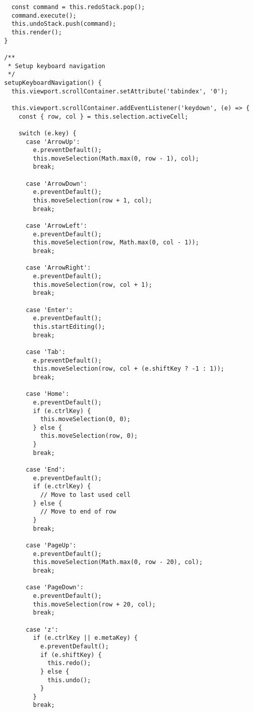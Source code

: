 \documentclass[11pt]{article}
\begin{document}
\begin{verbatim}
    const command = this.redoStack.pop();
    command.execute();
    this.undoStack.push(command);
    this.render();
  }
  
  /**
   * Setup keyboard navigation
   */
  setupKeyboardNavigation() {
    this.viewport.scrollContainer.setAttribute('tabindex', '0');
    
    this.viewport.scrollContainer.addEventListener('keydown', (e) => {
      const { row, col } = this.selection.activeCell;
      
      switch (e.key) {
        case 'ArrowUp':
          e.preventDefault();
          this.moveSelection(Math.max(0, row - 1), col);
          break;
          
        case 'ArrowDown':
          e.preventDefault();
          this.moveSelection(row + 1, col);
          break;
          
        case 'ArrowLeft':
          e.preventDefault();
          this.moveSelection(row, Math.max(0, col - 1));
          break;
          
        case 'ArrowRight':
          e.preventDefault();
          this.moveSelection(row, col + 1);
          break;
          
        case 'Enter':
          e.preventDefault();
          this.startEditing();
          break;
          
        case 'Tab':
          e.preventDefault();
          this.moveSelection(row, col + (e.shiftKey ? -1 : 1));
          break;
          
        case 'Home':
          e.preventDefault();
          if (e.ctrlKey) {
            this.moveSelection(0, 0);
          } else {
            this.moveSelection(row, 0);
          }
          break;
          
        case 'End':
          e.preventDefault();
          if (e.ctrlKey) {
            // Move to last used cell
          } else {
            // Move to end of row
          }
          break;
          
        case 'PageUp':
          e.preventDefault();
          this.moveSelection(Math.max(0, row - 20), col);
          break;
          
        case 'PageDown':
          e.preventDefault();
          this.moveSelection(row + 20, col);
          break;
          
        case 'z':
          if (e.ctrlKey || e.metaKey) {
            e.preventDefault();
            if (e.shiftKey) {
              this.redo();
            } else {
              this.undo();
            }
          }
          break;
          

\end{verbatim}
\end{document}
